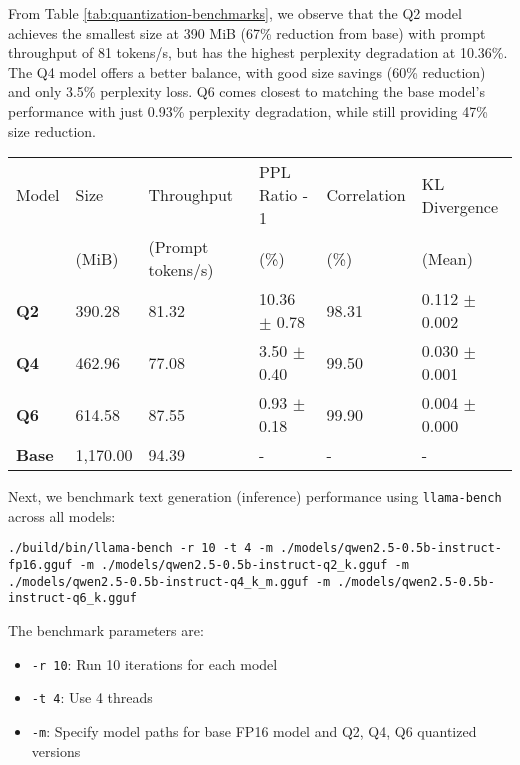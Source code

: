 From Table \ref{tab:quantization-benchmarks}, we observe that the Q2 model achieves the smallest size at 390 MiB (67\% reduction from base) with prompt throughput of 81 tokens/s, but has the highest perplexity degradation at 10.36\%. The Q4 model offers a better balance, with good size savings (60\% reduction) and only 3.5\% perplexity loss. Q6 comes closest to matching the base model's performance with just 0.93\% perplexity degradation, while still providing 47\% size reduction.

\begin{table*}[h!]
\centering
\caption{Quantization Benchmark Results.}
\label{tab:quantization-benchmarks}
\begin{tabular}{llllll}
\toprule
Model & Size & Throughput & PPL Ratio - 1 & Correlation & KL Divergence \\
      & (MiB) & (Prompt tokens/s) & (\%)          & (\%)        & (Mean) \\
\midrule
\textbf{Q2}    & 390.28     & 81.32               & 10.36 $\pm$ 0.78     & 98.31          & 0.112 $\pm$ 0.002     \\
\textbf{Q4}    & 462.96     & 77.08               & 3.50 $\pm$ 0.40      & 99.50          & 0.030 $\pm$ 0.001     \\
\textbf{Q6}    & 614.58     & 87.55               & 0.93 $\pm$ 0.18      & 99.90          & 0.004 $\pm$ 0.000     \\
\textbf{Base}  & 1,170.00   & 94.39               & -                & -              & -                 \\
\bottomrule
\end{tabular}
\end{table*}

Next, we benchmark text generation (inference) performance using \texttt{llama-bench} across all models:

\begin{verbatim}
./build/bin/llama-bench -r 10 -t 4 -m ./models/qwen2.5-0.5b-instruct-fp16.gguf -m ./models/qwen2.5-0.5b-instruct-q2_k.gguf -m ./models/qwen2.5-0.5b-instruct-q4_k_m.gguf -m ./models/qwen2.5-0.5b-instruct-q6_k.gguf
\end{verbatim}

The benchmark parameters are:
\begin{itemize}
\item \texttt{-r 10}: Run 10 iterations for each model
\item \texttt{-t 4}: Use 4 threads
\item \texttt{-m}: Specify model paths for base FP16 model and Q2, Q4, Q6 quantized versions
\end{itemize}

